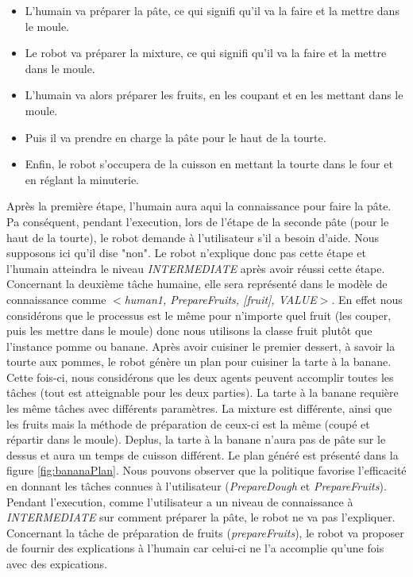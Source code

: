 \documentclass[a4paper,11pt,twoside]{StyleThese}
\begin{document}
\begin{itemize}
\item L'humain va préparer la pâte, ce qui signifi qu'il va la faire et la mettre dans le moule.
\item Le robot va préparer la mixture, ce qui signifi qu'il va la faire et la mettre dans le moule.
\item L'humain va alors préparer les fruits, en les coupant et en les mettant dans le moule.
\item Puis il va prendre en charge la pâte pour le haut de la tourte.
\item Enfin, le robot s'occupera de la cuisson en mettant la tourte dans le four et en réglant la minuterie.
\end{itemize} 

Après la première étape, l'humain aura aqui la connaissance pour faire la pâte. Pa conséquent, pendant l'execution, lors de l'étape de la seconde pâte (pour le haut de la tourte), le robot demande à l'utilisateur s'il a besoin d'aide. Nous supposons ici qu'il dise "non". Le robot n'explique donc pas cette étape et l'humain atteindra le niveau \textit{INTERMEDIATE} après avoir réussi cette étape. Concernant la deuxième tâche humaine, elle sera représenté dans le modèle de connaissance comme \textit{$<$human1, PrepareFruits, [fruit], VALUE$>$}. En effet nous considérons que le processus est le même pour n'importe quel fruit (les couper, puis les mettre dans le moule) donc nous utilisons la classe fruit plutôt que l'instance pomme ou banane.
%
%
Après avoir cuisiner le premier dessert, à savoir la tourte aux pommes, le robot génère un plan pour cuisiner la tarte à la banane. Cette fois-ci, nous considérons que les deux agents peuvent accomplir toutes les tâches (tout est atteignable pour les deux parties). La tarte à la banane requière les même tâches avec différents paramètres. La mixture est différente, ainsi que les fruits mais la méthode de préparation de ceux-ci est la même (coupé et répartir dans le moule). Deplus, la tarte à la banane n'aura pas de pâte sur le dessus et aura un temps de cuisson différent. Le plan généré est présenté dans la figure \ref{fig:bananaPlan}. Nous pouvons observer que la politique favorise l'efficacité en donnant les tâches connues à l'utilisateur (\textit{PrepareDough} et \textit{PrepareFruits}). Pendant l'execution, comme l'utilisateur a un niveau de connaissance à \textit{INTERMEDIATE} sur comment préparer la pâte, le robot ne va pas l'expliquer. Concernant la tâche de préparation de fruits (\textit{prepareFruits}), le robot va proposer de fournir des explications à l'humain car celui-ci ne l'a accomplie qu'une fois avec des expications.
\end{document}
